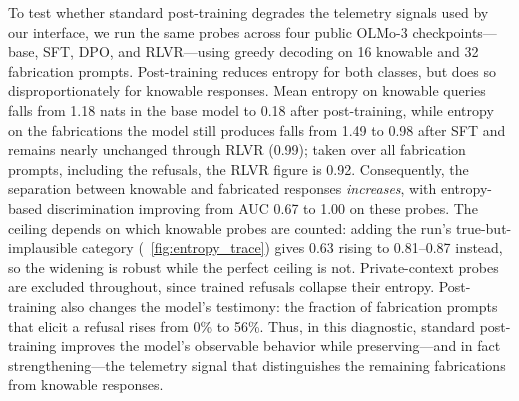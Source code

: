 To test whether standard post-training degrades the telemetry signals used by our interface, we run the same probes across four public OLMo-3 checkpoints---base, SFT, DPO, and RLVR---using greedy decoding on 16 knowable and 32 fabrication prompts.
Post-training reduces entropy for both classes, but does so disproportionately for knowable responses.
Mean entropy on knowable queries falls from 1.18 nats in the base model to 0.18 after post-training,
while entropy on the fabrications the model still produces falls from 1.49 to
0.98 after SFT and remains nearly unchanged through RLVR (0.99); taken over all
fabrication prompts, including the refusals, the RLVR figure is 0.92.
Consequently, the separation between knowable and fabricated responses \emph{increases},
with entropy-based discrimination improving from AUC 0.67 to 1.00 on these
probes. The ceiling depends on which knowable probes are counted: adding the
run's true-but-implausible category (\eg\ \autoref{fig:entropy_trace}) gives
0.63 rising to 0.81--0.87 instead, so the widening is robust while the perfect
ceiling is not. Private-context probes are excluded throughout, since trained
refusals collapse their entropy.
Post-training also changes the model's testimony: the fraction of fabrication prompts that elicit a refusal rises from 0\% to 56\%.
Thus, in this diagnostic, standard post-training improves the model's observable behavior while preserving---and in fact strengthening---the telemetry
signal that distinguishes the remaining fabrications from knowable responses.
